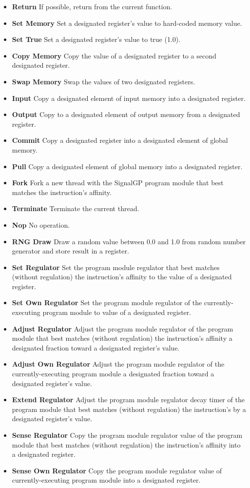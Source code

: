 \begin{itemize}
\item \textbf{Return}
If possible, return from the current function.
\item \textbf{Set Memory}
Set a designated register's value to hard-coded memory value.
\item \textbf{Set True}
Set a designated register's value to true (1.0).
\item \textbf{Copy Memory}
Copy the value of a designated register to a second designated register.
\item \textbf{Swap Memory}
Swap the values of two designated registers.
\item \textbf{Input}
Copy a designated element of input memory into a designated register.
\item \textbf{Output}
Copy to a designated element of output memory from a designated register.
\item \textbf{Commit}
Copy a designated register into a designated element of global memory.
\item \textbf{Pull}
Copy a designated element of global memory into a designated register.
\item \textbf{Fork}
Fork a new thread with the SignalGP program module that best matches the instruction's affinity.
\item \textbf{Terminate}
Terminate the current thread.
\item \textbf{Nop}
No operation.
\item \textbf{RNG Draw}
Draw a random value between 0.0 and 1.0 from random number generator and store result in a register.
\item \textbf{Set Regulator}
Set the program module regulator that best matches (without regulation) the instruction's affinity to the value of a designated register.
\item \textbf{Set Own Regulator}
Set the program module regulator of the currently-executing program module to value of a designated register.
\item \textbf{Adjust Regulator}
Adjust the program module regulator of the program module that best matches (without regulation) the instruction's affinity a designated fraction toward a designated register's value.
\item \textbf{Adjust Own Regulator}
Adjust the program module regulator of the currently-executing program module a designated fraction toward a designated register's value.
\item \textbf{Extend Regulator}
Adjust the program module regulator decay timer of the program module that best matches (without regulation) the instruction's by a designated register's value.
\item \textbf{Sense Regulator}
Copy the program module regulator value of the program module that best matches (without regulation) the instruction's affinity into a designated register.
\item \textbf{Sense Own Regulator}
Copy the program module regulator value of currently-executing program module into a designated register.
\end{itemize}

